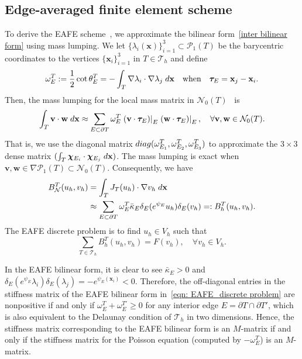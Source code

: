\documentclass[a4paper]{article}
\theoremstyle{plain}
\theoremstyle{definition}
\numberwithin{equation}{section}
\newcommand{\bv}{{\bf v}}
\newcommand{\bw}{{\bf w}}
\newcommand{\Th}{\mathcal{T}_h}
\begin{document}

\subsection{Edge-averaged finite element scheme}\label{EAFE}
To derive the EAFE scheme~\cite{XU99,LAZ05}, we approximate the bilinear form~\eqref{inter bilinear form} using mass lumping.
We let $\{\lambda_i(\mathbf{x})\}_{i=1}^3\subset \mathcal{P}_1(T)$ be the barycentric coordinates to the vertices $\{\mathbf{x}_i\}_{i=1}^3$ in $T\in \Th$ and define
\begin{equation*}
\omega_E^T:=\frac{1}{2}\cot{\theta_E^T}=-\int_T\nabla\lambda_i\cdot\nabla\lambda_j\;{\rm d}\mathbf{x}\quad\text{when}\quad\bm{\tau}_E=\mathbf{x}_j-\mathbf{x}_i.
\end{equation*}
Then, the mass lumping for the local mass matrix in $\mathcal{N}_0(T)$~\cite{haugazeau1993condensation} is
\begin{equation}
\int_T\mathbf{v}\cdot\mathbf{w}\;{\rm d}\mathbf{x}\approx\sum_{E\subset \partial T}\omega_E^T\left.(\mathbf{v}\cdot\bm{\tau}_E)\right|_E\left.(\mathbf{w}\cdot\bm{\tau}_E)\right|_E,\quad\forall\bv,\bw\in \mathcal{N}_0(T).\label{eqn: mass lumping approx}
\end{equation}
That is, we use the diagonal matrix ${\rm diag} ( \omega_{E_1}^T,  \omega_{E_2}^T, \omega_{E_3}^T)$ to approximate the $3\times 3$ dense matrix $(\int_T\bm{\chi}_{E_i}\cdot \bm{\chi}_{E_j}\;{\rm d}\mathbf{x})$. 
The mass lumping is exact when $\mathbf{v},\mathbf{w}\in \nabla \mathcal{P}_1(T)\subset \mathcal N_0(T)$. 
Consequently, we have
\begin{align*}
B^{T}_\mathcal{N}(u_h,v_h) &= \int_T J_T(u_h)\cdot\nabla v_h\;{\rm d}\mathbf{x}\\ 
&\approx \sum_{E\subset \partial T}\omega_E^T\bar{\kappa}_E\delta_E(e^{\psi_E} u_h)\delta_E(v_h)=:B_{h}^T(u_h,v_h).
\end{align*}
The EAFE discrete problem is to find $u_h\in V_h$ such that 
\begin{equation}\label{eqn: EAFE_discrete problem}
\sum_{T\in\mathcal{T}_h}B_h^T(u_h,v_h)=F(v_h),\quad\forall v_h\in V_h.
\end{equation}

In the EAFE bilinear form, it is clear to see $\bar{\kappa}_E>0$ and $\delta_E(e^{\psi_E} \lambda_i)\delta_E(\lambda_j)=-e^{\psi_E(\mathbf{x}_i)}<0$. Therefore, the off-diagonal entries in the stiffness matrix of the EAFE bilinear form in~\eqref{eqn: EAFE_discrete problem} are nonpositive if and only if $\omega_E^T+\omega_E^{T'}\geq 0$ for any interior edge $E=\partial T\cap \partial T'$, which is also equivalent to the Delaunay condition of $\Th$ in two dimensions.
Hence, the stiffness matrix corresponding to the EAFE bilinear form is an $M$-matrix if and only if the stiffness matrix for the Poisson equation (computed by $-\omega_E^T$) is an $M$-matrix.
\end{document}
